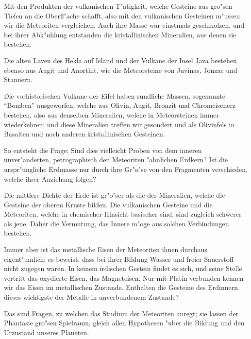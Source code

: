 \documentclass[a4paper, 11pt, oneside]{article}
\begin{document}
Mit den Produkten der vulkanischen T"atigkeit, welche Gesteine aus gro"sen Tiefen an die Oberfl"ache schafft, also mit den vulkanischen Gesteinen m"ussen wir die Meteoriten vergleichen. Auch ihre Masse war einstmals geschmolzen, und bei ihrer Abk"uhlung entstanden die kristallinischen Mineralien, aus denen sie bestehen.

Die alten Laven des Hekla auf Island und der Vulkane der Insel Java bestehen ebenso aus Augit und Anorthit, wie die Meteorsteine von Juvinas, Jonzac und Stannern.

Die vorhistorischen Vulkane der Eifel haben rundliche Massen, sogenannte "`Bomben"' ausgeworfen, welche aus Olivin, Augit, Bronzit und Chromeisenerz bestehen, also aus denselben Mineralien, welche in Meteorsteinen immer wiederkehren; und diese Mineralien treffen wir gesondert und als Olivinfels in Basalten und noch anderen kristallinischen Gesteinen.

So entsteht die Frage: Sind dies vielleicht Proben von dem inneren unver"anderten, petrographisch den Meteoriten "ahnlichen Erdkern? Ist die urspr"ungliche Erdmasse nur durch ihre Gr"o"se von den Fragmenten verschieden, welche ihrer Anziehung folgen?

Die mittlere Dichte der Erde ist gr"o"ser als die der Mineralien, welche die Gesteine der oberen Kruste bilden. Die vulkanischen Gesteine und die Meteoriten, welche in chemischer Hinsicht basischer sind, sind zugleich schwerer als jene. Daher die Vermutung, das Innere m"oge aus solchen Verbindungen bestehen.

Immer aber ist das metallische Eisen der Meteoriten ihnen durchaus eigent"umlich; es beweist, dass bei ihrer Bildung Wasser und freier Sauerstoff nicht zugegen waren. In keinem irdischen Gestein findet es sich, und seine Stelle vertritt das oxydierte Eisen, das Magneteisen. Nur mit Platin verbunden kennen wir das Eisen im metallischen Zustande. Enthalten die Gesteine des Erdinnern dieses wichtigste der Metalle in unverbundenem Zustande?

Das sind Fragen, zu welchen das Studium der Meteoriten anregt; sie lassen der Phantasie gro"sen Spielraum, gleich allen Hypothesen "uber die Bildung und den Urzustand unseres Planeten.
\clearpage
\end{document}
